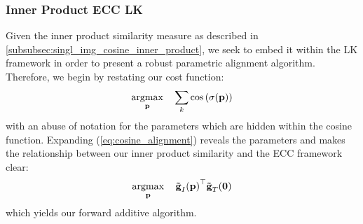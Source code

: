 \subsubsection{Inner Product ECC LK}\label{subsubsec:lk-inner-product}
Given the inner product similarity measure as described in
\cref{subsubsec:singl_img_cosine_inner_product}, we seek to embed it within the LK
framework in order to present a robust parametric alignment algorithm.
Therefore, we begin by restating our cost function:
\begin{equation}\label{eq:cosine_alignment}
   \argmax_{\p} \quad \sum_k \cos{\left(\sigma(\p)\right)}
\end{equation}
with an abuse of notation for the parameters which are hidden within the cosine
function. Expanding (\ref{eq:cosine_alignment}) reveals the parameters and makes
the relationship between our inner product similarity and the ECC framework
clear:
\begin{equation}\label{eq:ip-ecc-lk-max}
   \argmax_{\p} \quad {\bb{\tilde{g}}_{I}(\p)}^{\top} \bb{\tilde{g}}_T(\zero)
\end{equation}
which yields our forward additive algorithm.

